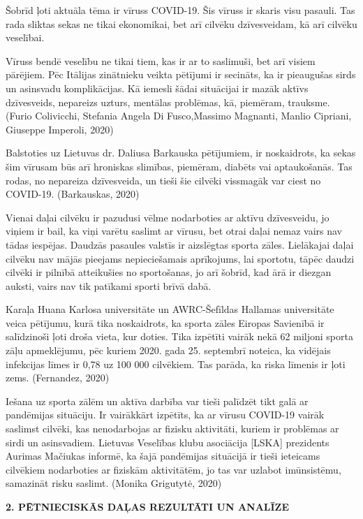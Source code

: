 \documentclass[12pt]{article}
\begin{document}
Šobrīd ļoti aktuāla tēma ir vīruss COVID-19. Šis vīruss ir skaris visu pasauli. Tas rada sliktas sekas ne tikai ekonomikai, bet arī cilvēku dzīvesveidam, kā arī cilvēku veselībai. \par
Vīruss bendē veselību ne tikai tiem, kas ir ar to saslimuši, bet arī visiem pārējiem. Pēc Itālijas zinātnieku veikta pētījumi ir secināts, ka ir pieaugušas sirds un asinsvadu komplikācijas. Kā iemesli šādai situācijai ir mazāk aktīvs dzīvesveids, nepareizs uzturs, mentālas problēmas, kā, piemēram, trauksme. (Furio Colivicchi, Stefania Angela Di Fusco,Massimo Magnanti, Manlio Cipriani, Giuseppe Imperoli, 2020)\par
Balstoties uz Lietuvas dr. Daliusa Barkauska pētījumiem, ir noskaidrots, ka sekas šim vīrusam būs arī hroniskas slimības, piemēram, diabēts vai aptaukošanās. Tas rodas, no nepareiza dzīvesveida, un tieši šie cilvēki vissmagāk var ciest no COVID-19. (Barkauskas, 2020) \par
Vienai daļai cilvēku ir pazudusi vēlme nodarboties ar aktīvu dzīvesveidu, jo viņiem ir bail, ka viņi varētu saslimt ar vīrusu, bet otrai daļai nemaz vairs nav tādas iespējas. Daudzās pasaules valstīs ir aizslēgtas sporta zāles. Lielākajai daļai cilvēku nav mājās pieejams nepieciešamais aprīkojums, lai sportotu, tāpēc daudzi cilvēki ir pilnībā atteikušies no sportošanas, jo arī šobrīd, kad ārā ir diezgan auksti, vairs nav tik patīkami sporti brīvā dabā. \par
Karaļa Huana Karlosa universitāte un AWRC-Šefīldas Hallamas universitāte veica pētījumu, kurā tika noskaidrots, ka sporta zāles Eiropas Savienībā ir salīdzinoši ļoti droša vieta, kur doties. Tika izpētīti vairāk nekā 62 miljoni sporta zāļu apmeklējumu, pēc kuriem 2020. gada 25. septembrī noteica, ka vidējais infekcijas līmes ir 0,78 uz 100 000 cilvēkiem. Tas parāda, ka riska līmenis ir ļoti zems. (Fernandez, 2020) \par
Iešana uz sporta zālēm un aktīva darbība var tieši palīdzēt tikt galā ar pandēmijas situāciju. Ir vairākkārt izpētīts, ka ar vīrusu COVID-19 vairāk saslimst cilvēki, kas nenodarbojas ar fizisku aktivitāti, kuriem ir problēmas ar sirdi un asinsvadiem.  
Lietuvas Veselības klubu asociācija [LSKA] prezidents Aurimas Mačiukas informē, ka šajā pandēmijas situācijā ir tieši ieteicams cilvēkiem nodarboties ar fiziskām aktivitātēm, jo tas var uzlabot imūnsistēmu, samazināt risku saslimt. 
  (Monika Grigutytė, 2020)

\newpage

\begin{center}
\fontsize{14}{}\selectfont\textbf{2. PĒTNIECISKĀS DAĻAS REZULTĀTI UN ANALĪZE}
\end{center}
\end{document}
